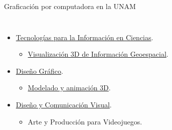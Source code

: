 \begin{frame}{Graficación por computadora en la UNAM}
\begin{columns}
\begin{itemize}
    \begin{itemize}
        \item Computación Gráfica e Interacción Humano Computadora.
        \item Computación Gráfica Avanzada.
    \end{itemize}
    \item \href{https://www.enesmorelia.unam.mx/licenciaturas/tecnologias-para-la-informacion-en-ciencias/}{Tecnologías para la Información en Ciencias}.
    \begin{itemize}
        \item \href{https://www.enesmorelia.unam.mx/wp-content/uploads/2021/07/Visualizacio\%CC\%81n-3D-de-Informacio\%CC\%81n-Geoespacial.pdf}{Visualización 3D de Información Geoespacial}.
    \end{itemize}
    \item \href{https://www.acatlan.unam.mx/index.php?id=23}{Diseño Gráfico}.
    \begin{itemize}
        \item \href{https://www.acatlan.unam.mx/files/PlanesDeEstudio/DisenoGrafico/7/Optativas/Modelado_y_Animacion_3D.pdf}{Modelado y animación 3D}.
    \end{itemize}
    \item \href{https://fad.unam.mx/oferta-academica/licenciaturas/dcv/}{Diseño y Comunicación Visual}.
    \begin{itemize}
        \item Arte y Producción para Videojuegos.
    \end{itemize}
\end{itemize}
\end{columns}
\end{frame}

